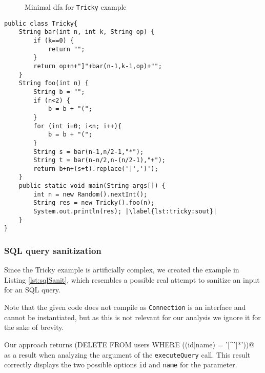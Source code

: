 \begin{figure}
	\caption{Minimal \ac{dfa} for \lstinline|Tricky| example}
	\label{fig:eval:tricky:dfamin}
\end{figure}


\begin{lstlisting}[float, escapechar=|, numbers=right, caption=Tricky example, label=lst:tricky, captionpos=b, basicstyle=\small\ttfamily]
public class Tricky{
	String bar(int n, int k, String op) {
		if (k==0) {
			return "";
		}
		return op+n+"]"+bar(n-1,k-1,op)+"";
	}
	String foo(int n) {
		String b = "";
		if (n<2) {
			b = b + "(";
		}
		for (int i=0; i<n; i++){
			b = b + "(";
		}
		String s = bar(n-1,n/2-1,"*");
		String t = bar(n-n/2,n-(n/2-1),"+");
		return b+n+(s+t).replace(']',')');
	}
	public static void main(String args[]) {
		int n = new Random().nextInt();
		String res = new Tricky().foo(n);
		System.out.println(res); |\label{lst:tricky:sout}|
	}
}
\end{lstlisting}

\subsubsection{SQL query sanitization}

Since the Tricky example is artificially complex, we created the example in Listing \ref{lst:sqlSanit}, which resembles a possible real attempt to sanitize an input for an SQL query.

Note that the given code does not compile as \lstinline|Connection| is an interface and cannot be instantiated, but as this is not relevant for our analysis we ignore it for the sake of brevity.

Our approach returns \Verb@(DELETE \* FROM users WHERE ((id|name) = '[^'\-]*'))@ as a result when analyzing the argument of the \lstinline|executeQuery| call. This result correctly displays the two possible options \lstinline|id| and \lstinline|name| for the parameter.


